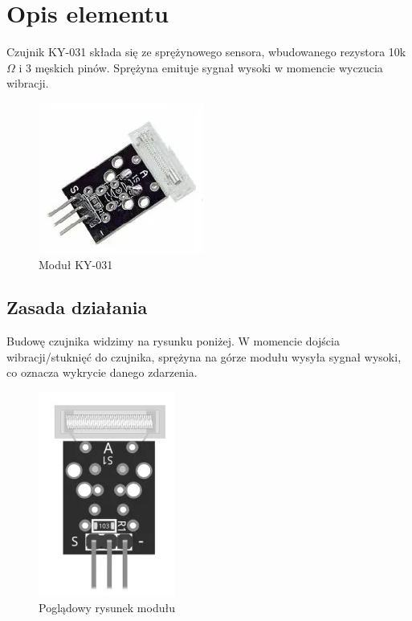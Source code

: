 \documentclass[11pt, a4paper]{article}
\institute{Instytut Robotyki i Inteligencji Maszynowej}
\begin{document}
\newpage

\section*{Opis elementu} 
Czujnik KY-031 składa się ze sprężynowego sensora, wbudowanego rezystora 10k $\Omega$ i 3 męskich pinów. Sprężyna emituje sygnał wysoki w momencie wyczucia wibracji. 

\vspace{0.5cm}
\begin{figure}[h]
\centering
\includegraphics[scale=0.5]{fig/KY-031/zdj_modułu/fig1.png}
\caption{Moduł KY-031}
\label{fig:sub1}
\end{figure}
\vspace{0.5cm}

\subsection{Zasada działania}
Budowę czujnika widzimy na rysunku poniżej. W momencie dojścia wibracji/stuknięć do czujnika, sprężyna na górze modułu wysyła sygnał wysoki, co oznacza wykrycie danego zdarzenia.

\vspace{0.5cm}
\begin{figure}[h]
\centering
\includegraphics{fig/KY-031/zasada_dzialania/fig2.png}
\caption{Poglądowy rysunek modułu}
\label{fig:sub1}
\end{figure}
\vspace{0.5cm}
\end{document}
